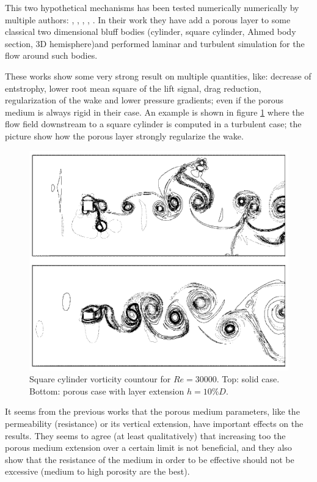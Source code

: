 This two hypothetical mechanisms has been tested numerically numerically by multiple authors: \citet{bruneau2004passive}, \citet{bruneau2008numerical}, \citet{bhattacharyya2011reduction}, \citet{naito2012numerical}, \citet{mimeau2017passive}.
In their work they have add a porous layer to some classical two dimensional bluff bodies (cylinder, square cylinder, Ahmed body section, 3D hemisphere)and performed laminar and turbulent simulation for the flow around such bodies.

These works show some very strong result on multiple quantities, like: decrease of entstrophy, lower root mean square of the lift signal, drag reduction, regularization of the wake and lower pressure gradients; even if the porous medium is always rigid in their case.
An example is shown in figure \ref{fig:porous_cylinder} where the flow field downstream to a square cylinder is computed in a turbulent case; the picture show how the porous layer strongly regularize the wake.

\begin{figure}[h]
	\centering
	\includegraphics[width=0.7\linewidth]{chapter_1/cylinder_porous}
	\caption{Square cylinder vorticity countour for $Re=30000$. Top: solid case. Bottom: porous case with layer extension $h=10\% D$.}
	\label{fig:porous_cylinder}
\end{figure}


It seems from the previous works that the porous medium parameters, like the permeability (resistance) or its vertical extension, have important effects on the results.
They seems to agree (at least qualitatively) that increasing too the porous medium extension over a certain limit is not beneficial, and they also show that the resistance of the medium in order to be effective should not be excessive (medium to high porosity are the best).

